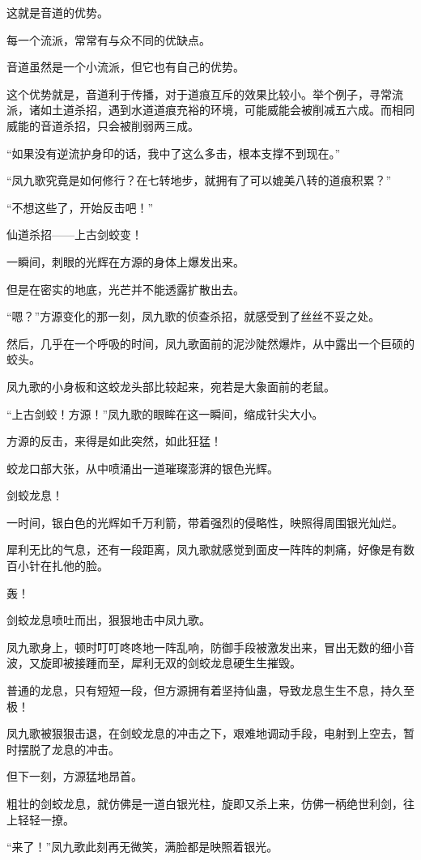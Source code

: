 \begin{this_body}
这就是音道的优势。

每一个流派，常常有与众不同的优缺点。

音道虽然是一个小流派，但它也有自己的优势。

这个优势就是，音道利于传播，对于道痕互斥的效果比较小。举个例子，寻常流派，诸如土道杀招，遇到水道道痕充裕的环境，可能威能会被削减五六成。而相同威能的音道杀招，只会被削弱两三成。

“如果没有逆流护身印的话，我中了这么多击，根本支撑不到现在。”

“凤九歌究竟是如何修行？在七转地步，就拥有了可以媲美八转的道痕积累？”

“不想这些了，开始反击吧！”

仙道杀招——上古剑蛟变！

一瞬间，刺眼的光辉在方源的身体上爆发出来。

但是在密实的地底，光芒并不能透露扩散出去。

“嗯？”方源变化的那一刻，凤九歌的侦查杀招，就感受到了丝丝不妥之处。

然后，几乎在一个呼吸的时间，凤九歌面前的泥沙陡然爆炸，从中露出一个巨硕的蛟头。

凤九歌的小身板和这蛟龙头部比较起来，宛若是大象面前的老鼠。

“上古剑蛟！方源！”凤九歌的眼眸在这一瞬间，缩成针尖大小。

方源的反击，来得是如此突然，如此狂猛！

蛟龙口部大张，从中喷涌出一道璀璨澎湃的银色光辉。

剑蛟龙息！

一时间，银白色的光辉如千万利箭，带着强烈的侵略性，映照得周围银光灿烂。

犀利无比的气息，还有一段距离，凤九歌就感觉到面皮一阵阵的刺痛，好像是有数百小针在扎他的脸。

轰！

剑蛟龙息喷吐而出，狠狠地击中凤九歌。

凤九歌身上，顿时叮叮咚咚地一阵乱响，防御手段被激发出来，冒出无数的细小音波，又旋即被接踵而至，犀利无双的剑蛟龙息硬生生摧毁。

普通的龙息，只有短短一段，但方源拥有着坚持仙蛊，导致龙息生生不息，持久至极！

凤九歌被狠狠击退，在剑蛟龙息的冲击之下，艰难地调动手段，电射到上空去，暂时摆脱了龙息的冲击。

但下一刻，方源猛地昂首。

粗壮的剑蛟龙息，就仿佛是一道白银光柱，旋即又杀上来，仿佛一柄绝世利剑，往上轻轻一撩。

“来了！”凤九歌此刻再无微笑，满脸都是映照着银光。


\end{this_body}
